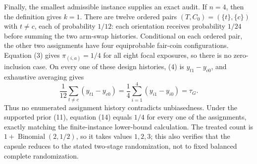 Finally, the smallest admissible instance supplies an exact audit.  If \(n=4\), then the definition gives \(k=1\).  There are twelve ordered pairs \((T,C_0)=(\{t\},\{c\})\) with \(t\ne c\), each of probability \(1/12\): each orientation receives probability \(1/24\) before summing the two arm-swap histories.  Conditional on each ordered pair, the other two assignments have four equiprobable fair-coin configurations.  Equation (3) gives \(\pi_{(i,a)}=1/4\) for all eight focal exposures, so there is no zero-inclusion case.  On every one of these design histories, (4) is \(y_{t1}-y_{c0}\), and exhaustive averaging gives
\[
 \frac1{12}\sum_{t\ne c}(y_{t1}-y_{c0})
 =\frac14\sum_{i=1}^4(y_{i1}-y_{i0})
 =\tau_G. \tag{17}
\]
Thus no enumerated assignment history contradicts unbiasedness.  Under the supported prior (11), equation (14) equals \(1/4\) for every one of the assignments, exactly matching the finite-instance lower-bound calculation.  The treated count is \(1+\operatorname{Binomial}(2,1/2)\), so it takes values \(1,2,3\); this also verifies that the capsule reduces to the stated two-stage randomization, not to fixed balanced complete randomization.
